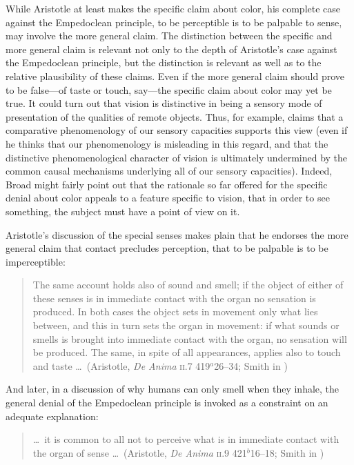 While Aristotle at least makes the specific claim about color, his complete case against the Empedoclean principle, to be perceptible is to be palpable to sense, may involve the more general claim. The distinction between the specific and more general claim is relevant not only to the depth of Aristotle's case against the Empedoclean principle, but the distinction is relevant as well as to the relative plausibility of these claims. Even if the more general claim should prove to be false---of taste or touch, say---the specific claim about color may yet be true. It could turn out that vision is distinctive in being a sensory mode of presentation of the qualities of remote objects. Thus, for example, \citet[]{Broad:1952kx} claims that a comparative phenomenology of our sensory capacities supports this view (even if he thinks that our phenomenology is misleading in this regard, and that the distinctive phenomenological character of vision is ultimately undermined by the common causal mechanisms underlying all of our sensory capacities). Indeed, Broad might fairly point out that the rationale so far offered for the specific denial about color appeals to a feature specific to vision, that in order to see something, the subject must have a point of view on it.

Aristotle's discussion of the special senses makes plain that he endorses the more general claim that contact precludes perception, that to be palpable is to be imperceptible:
\begin{quote}
	The same account holds also of sound and smell; if the object of either of these senses is in immediate contact with the organ no sensation is produced. In both cases the object sets in movement only what lies between, and this in turn sets the organ in movement: if what sounds or smells is brought into immediate contact with the organ, no sensation will be produced. The same, in spite of all appearances, applies also to touch and taste \ldots\ (Aristotle, \emph{De Anima} \textsc{ii}.7 419\( ^{a} \)26--34; Smith in \citealt[34]{Barnes:1984uq})
\end{quote}
And later, in a discussion of why humans can only smell when they inhale, the general denial of the Empedoclean principle is invoked as a constraint on an adequate explanation:
\begin{quote}
	\ldots\ it is common to all not to perceive what is in immediate contact with the organ of sense \ldots\ (Aristotle, \emph{De Anima} \textsc{ii}.9 421\( ^{b} \)16--18; Smith in \citealt[38]{Barnes:1984uq})
\end{quote}

